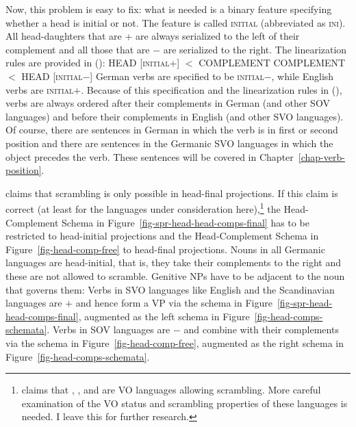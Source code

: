 Now, this problem is easy to fix: what is needed is a binary feature specifying whether a head is
initial or not. The feature is called \textsc{initial} (abbreviated as \textsc{ini}). All
head-daughters that are \ini{}+ are always serialized to the left of their complement and all those
that are \ini{}$-$ are serialized to the right. The linearization rules are provided in ():
\eal
\label{lp-regeln}
\ex HEAD [\textsc{initial}+] $<$ COMPLEMENT
\ex COMPLEMENT $<$  HEAD [\textsc{initial}$-$]
\zl
German verbs are specified to be \textsc{initial}$-$, while English verbs are
\textsc{initial}$+$. Because of this specification and the linearization rules in (), verbs
are always ordered after their complements in German (and other SOV languages) and before their
complements in English (and other SVO languages). Of course, there are sentences in German in which
the verb is in first or second position and there are sentences in the Germanic SVO languages in
which the object precedes the verb. These sentences will be covered in
Chapter~\ref{chap-verb-position}.


\citet[]{Haider2020a} claims that scrambling is only possible in
head-final projections. If this claim is correct (at least for the
languages under consideration here),\footnote{
  \citet[]{Santorini93a} claims that , ,  and 
  are VO languages allowing scrambling. More careful examination of the VO status and scrambling
  properties of these languages is needed. I leave this for further research.
} the Head-Complement Schema in Figure~\ref{fig-spr-head-head-comps-final} has to
be restricted to head-initial projections and the Head-Complement Schema in Figure~\ref{fig-head-comp-free} to
head-final projections. Nouns in all Germanic languages are head-initial, that is, they take their
complements to the right and these are not allowed to scramble. Genitive NPs have to be adjacent to
the noun that governs them:
\eal
{}
\zl
Verbs in SVO languages like English and the Scandinavian languages are \initial{}$+$ and hence form a
VP via the schema in Figure~\ref{fig-spr-head-head-comps-final}, augmented as the left schema in
Figure~\ref{fig-head-comps-schemata}. Verbs in SOV languages are \initial{}$-$ and combine with their
complements via the schema in Figure~\ref{fig-head-comp-free}, augmented as the right schema in
Figure~\ref{fig-head-comps-schemata}. 


